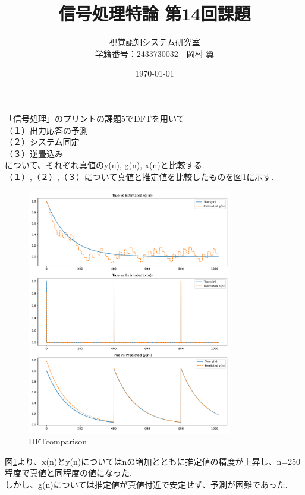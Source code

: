 \documentclass[10pt,dvipdfmx]{jsarticle}
\begin{document}
\title{信号処理特論 第14回課題}
\author{視覚認知システム研究室\\学籍番号：2433730032　岡村 翼}
\date{\today}
\maketitle

{ }
「信号処理」のプリントの課題5でDFTを用いて\\
（１）出力応答の予測\\
（２）システム同定\\
（３）逆畳込み\\
について、それぞれ真値のy(n), g(n), x(n)と比較する.\\

（１）,（２）,（３）について真値と推定値を比較したものを図\ref{fig:comparison}に示す.\\

\begin{figure}[h]
    \centering
    \includegraphics[width=0.8\textwidth]{comparison.pdf}
    \caption{DFTcomparison}
    \label{fig:comparison}
\end{figure}

 図\ref{fig:comparison}より、x(n)とy(n)についてはnの増加とともに推定値の精度が上昇し、n=250程度で真値と同程度の値になった.\\
 しかし、g(n)については推定値が真値付近で安定せず、予測が困難であった.
\end{document}
